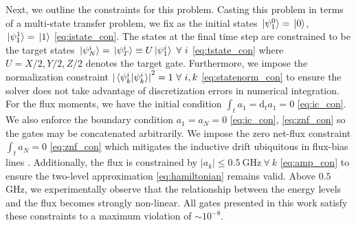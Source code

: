 Next, we outline the constraints for this problem.
Casting this problem in terms of a multi-state transfer problem, we fix as the initial states
 $\ket*{\psi^{0}_{1}} = \ket*{0}$, $\ket*{\psi^{1}_{1}} = \ket*{1}$
\eqref{eq:istate_con}.
The states at the final time step are constrained to be
the target states $\ket*{\psi^{i}_{N}} = \ket*{\psi^{i}_{T}} \equiv
U \ket*{\psi^{i}_{1}} \ \forall \ i$
\eqref{eq:tstate_con} where $U = X/2, Y/2, Z/2$ denotes the target gate.
Furthermore, we impose the normalization constraint
${\lvert \braket*{\psi^{i}_{k}}{\psi^{i}_{k}} \rvert}^{2} = 1 \ \forall \ i,k$
\eqref{eq:statenorm_con}
to ensure the solver does not take advantage of discretization errors in numerical integration.
For the flux moments,
we have the initial condition $\int_{t} a_{1} = \mathrm{d}_{t} a_{1} = 0$
\eqref{eq:ic_con}.
We also enforce the boundary condition $a_{1} = a_{N} = 0$ \eqref{eq:ic_con}, \eqref{eq:znf_con}
so the gates may be concatenated arbitrarily. 
We impose the zero net-flux constraint $\int_{t} a_{N} = 0$
\eqref{eq:znf_con}
which mitigates the inductive drift ubiquitous in flux-bias lines
\cite{battistel2019fast, krantz2019quantum, zhang2020universal}.
Additionally, the flux is constrained by $\lvert a_{k} \rvert \leq 0.5 \ \textrm{GHz}
\ \forall \ k$ \eqref{eq:amp_con} to ensure the two-level approximation
\eqref{eq:hamiltonian} remains valid. Above $0.5$ GHz,
we experimentally observe that the relationship
between the energy levels and the flux becomes strongly non-linear.
All gates presented in this work satisfy these constraints to
a maximum violation of $\sim 10^{-8}$.

